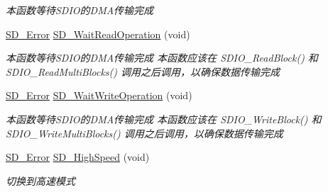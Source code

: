 \begin{DoxyCompactItemize}
\begin{DoxyCompactList}\small\item\em 本函数等待\+S\+D\+I\+O的\+D\+M\+A传输完成 \end{DoxyCompactList}\item 
\hyperlink{group__sd__card_gacff91fa68daa1d1ee967b5b3fb3dbd8c}{S\+D\+\_\+\+Error} \hyperlink{group__sd__card_ga42ab410b834d74d7f3ee757dc888b8cc}{S\+D\+\_\+\+Wait\+Read\+Operation} (void)
\begin{DoxyCompactList}\small\item\em 本函数等待\+S\+D\+I\+O的\+D\+M\+A传输完成 本函数应该在 S\+D\+I\+O\+\_\+\+Read\+Block() 和 S\+D\+I\+O\+\_\+\+Read\+Multi\+Blocks() 调用之后调用，以确保数据传输完成 \end{DoxyCompactList}\item 
\hyperlink{group__sd__card_gacff91fa68daa1d1ee967b5b3fb3dbd8c}{S\+D\+\_\+\+Error} \hyperlink{group__sd__card_gad55967ea67075f01671fb2144c7f7b0d}{S\+D\+\_\+\+Wait\+Write\+Operation} (void)
\begin{DoxyCompactList}\small\item\em 本函数等待\+S\+D\+I\+O的\+D\+M\+A传输完成 本函数应该在 S\+D\+I\+O\+\_\+\+Write\+Block() 和 S\+D\+I\+O\+\_\+\+Write\+Multi\+Blocks() 调用之后调用，以确保数据传输完成 \end{DoxyCompactList}\item 
\hyperlink{group__sd__card_gacff91fa68daa1d1ee967b5b3fb3dbd8c}{S\+D\+\_\+\+Error} \hyperlink{group__sd__card_ga2457c748cf09c7ad5d3c9211d11e3fab}{S\+D\+\_\+\+High\+Speed} (void)
\begin{DoxyCompactList}\small\item\em 切换到高速模式 \end{DoxyCompactList}\end{DoxyCompactItemize}
